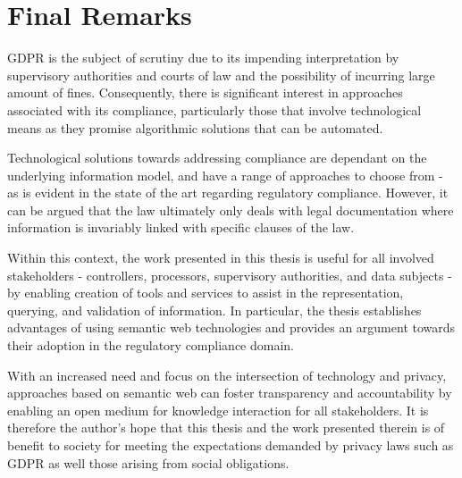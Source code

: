 \section{Final Remarks}\label{sec:conclusion-final-remarks}
GDPR is the subject of scrutiny due to its impending interpretation by supervisory authorities and courts of law and the possibility of incurring large amount of fines. Consequently, there is significant interest in approaches associated with its compliance, particularly those that involve technological means as they promise algorithmic solutions that can be automated.

Technological solutions towards addressing compliance are dependant on the underlying information model, and have a range of approaches to choose from - as is evident in the state of the art regarding regulatory compliance. However, it can be argued that the law ultimately only deals with legal documentation where information is invariably linked with specific clauses of the law.


Within this context, the work presented in this thesis is useful for all involved stakeholders - controllers, processors, supervisory authorities, and data subjects - by enabling creation of tools and services to assist in the representation, querying, and validation of information. In particular, the thesis establishes advantages of using semantic web technologies and provides an argument towards their adoption in the regulatory compliance domain.

With an increased need and focus on the intersection of technology and privacy, approaches based on semantic web can foster transparency and accountability by enabling an open medium for knowledge interaction for all stakeholders. It is therefore the author's hope that this thesis and the work presented therein is of benefit to society for meeting the expectations demanded by privacy laws such as GDPR as well those arising from social obligations. 
